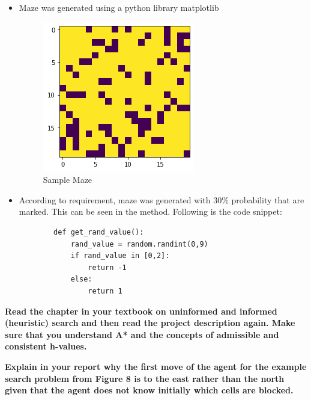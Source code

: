 \documentclass[a4 paper]{article}
\begin{document}
\vspace{-15pt}
\begin{itemize}
    \item Maze was generated using a python library matplotlib
    \begin{figure}[H]
        \centering
        \includegraphics[scale=0.40]{sampleMaze.png}
        \caption{Sample Maze}
        \label{}
    \end{figure}
    \vspace{-20pt}
    \item According to requirement, maze was generated with 30\% probability that are marked. This can be seen in the method. Following is the code snippet:
    \begin{verbatim}
        def get_rand_value():
            rand_value = random.randint(0,9)
            if rand_value in [0,2]:
                return -1
            else:
                return 1
    \end{verbatim}
\end{itemize}
\vspace{-25pt}

\textbf{\hspace{-15pt}Read the chapter in your textbook on uninformed and informed
(heuristic) search and then read the project description again. Make sure that you understand A* and the concepts of
admissible and consistent h-values.}

 \textbf{Explain in your report why the first move of the agent for the example search problem from Figure 8 is to the east rather
than the north given that the agent does not know initially which cells are blocked.}\\
\end{document}
